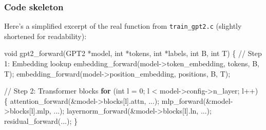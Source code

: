 \documentclass[
  letterpaper,
  DIV=11,
  numbers=noendperiod]{scrreprt}
\newenvironment{Shaded}{\begin{snugshade}}{\end{snugshade}}
\newcommand{\CommentTok}[1]{\textcolor[rgb]{0.37,0.37,0.37}{#1}}
\newcommand{\ControlFlowTok}[1]{\textcolor[rgb]{0.00,0.23,0.31}{\textbf{#1}}}
\newcommand{\DataTypeTok}[1]{\textcolor[rgb]{0.68,0.00,0.00}{#1}}
\newcommand{\DecValTok}[1]{\textcolor[rgb]{0.68,0.00,0.00}{#1}}
\newcommand{\NormalTok}[1]{\textcolor[rgb]{0.00,0.23,0.31}{#1}}
\newcommand{\OperatorTok}[1]{\textcolor[rgb]{0.37,0.37,0.37}{#1}}
\begin{document}
\subsubsection{Code skeleton}\label{code-skeleton}

Here's a simplified excerpt of the real function from
\texttt{train\_gpt2.c} (slightly shortened for readability):

\begin{Shaded}
\begin{Highlighting}[]
\DataTypeTok{void}\NormalTok{ gpt2\_forward}\OperatorTok{(}\NormalTok{GPT2 }\OperatorTok{*}\NormalTok{model}\OperatorTok{,} \DataTypeTok{int} \OperatorTok{*}\NormalTok{tokens}\OperatorTok{,} \DataTypeTok{int} \OperatorTok{*}\NormalTok{labels}\OperatorTok{,} \DataTypeTok{int}\NormalTok{ B}\OperatorTok{,} \DataTypeTok{int}\NormalTok{ T}\OperatorTok{)} \OperatorTok{\{}
    \CommentTok{// Step 1: Embedding lookup}
\NormalTok{    embedding\_forward}\OperatorTok{(}\NormalTok{model}\OperatorTok{{-}\textgreater{}}\NormalTok{token\_embedding}\OperatorTok{,}\NormalTok{ tokens}\OperatorTok{,}\NormalTok{ B}\OperatorTok{,}\NormalTok{ T}\OperatorTok{);}
\NormalTok{    embedding\_forward}\OperatorTok{(}\NormalTok{model}\OperatorTok{{-}\textgreater{}}\NormalTok{position\_embedding}\OperatorTok{,}\NormalTok{ positions}\OperatorTok{,}\NormalTok{ B}\OperatorTok{,}\NormalTok{ T}\OperatorTok{);}

    \CommentTok{// Step 2: Transformer blocks}
    \ControlFlowTok{for} \OperatorTok{(}\DataTypeTok{int}\NormalTok{ l }\OperatorTok{=} \DecValTok{0}\OperatorTok{;}\NormalTok{ l }\OperatorTok{\textless{}}\NormalTok{ model}\OperatorTok{{-}\textgreater{}}\NormalTok{config}\OperatorTok{{-}\textgreater{}}\NormalTok{n\_layer}\OperatorTok{;}\NormalTok{ l}\OperatorTok{++)} \OperatorTok{\{}
\NormalTok{        attention\_forward}\OperatorTok{(\&}\NormalTok{model}\OperatorTok{{-}\textgreater{}}\NormalTok{blocks}\OperatorTok{[}\NormalTok{l}\OperatorTok{].}\NormalTok{attn}\OperatorTok{,} \OperatorTok{...);}
\NormalTok{        mlp\_forward}\OperatorTok{(\&}\NormalTok{model}\OperatorTok{{-}\textgreater{}}\NormalTok{blocks}\OperatorTok{[}\NormalTok{l}\OperatorTok{].}\NormalTok{mlp}\OperatorTok{,} \OperatorTok{...);}
\NormalTok{        layernorm\_forward}\OperatorTok{(\&}\NormalTok{model}\OperatorTok{{-}\textgreater{}}\NormalTok{blocks}\OperatorTok{[}\NormalTok{l}\OperatorTok{].}\NormalTok{ln}\OperatorTok{,} \OperatorTok{...);}
\NormalTok{        residual\_forward}\OperatorTok{(...);}
    \OperatorTok{\}}


\end{Highlighting}
\end{Shaded}
\end{document}
